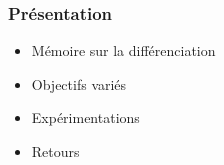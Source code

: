 \begin{frame}
    \frametitle{Présentation}
    \begin{itemize}
        \item Mémoire sur la différenciation
        \item Objectifs variés
        \item Expérimentations
        \item Retours
    \end{itemize}
\end{frame}
